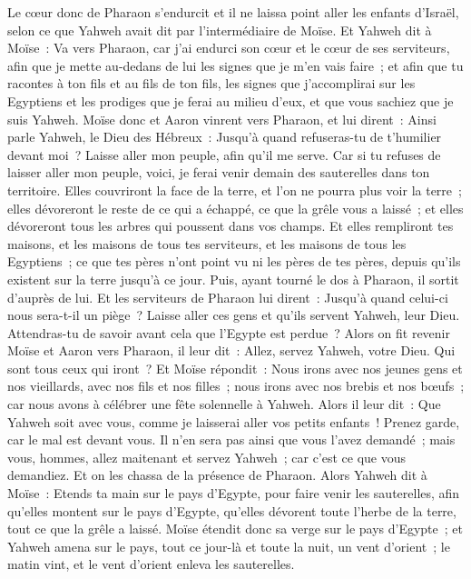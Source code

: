 \begin{multicols}{2}
Le cœur donc de Pharaon s'endurcit et il ne laissa point aller les enfants d'Israël, selon ce que Yahweh avait dit par l'intermédiaire de Moïse.
\VerseOne{} Et Yahweh dit à Moïse~: Va vers Pharaon, car j'ai endurci son cœur et le cœur de ses serviteurs, afin que je mette au-dedans de lui les signes que je m'en vais faire~;
et afin que tu racontes à ton fils et au fils de ton fils, les signes que j'accomplirai sur les Egyptiens et les prodiges que je ferai au milieu d'eux, et que vous sachiez que je suis Yahweh.
Moïse donc et Aaron vinrent vers Pharaon, et lui dirent~: Ainsi parle Yahweh, le Dieu des Hébreux~: Jusqu'à quand refuseras-tu de t'humilier devant moi~? Laisse aller mon peuple, afin qu'il me serve.
Car si tu refuses de laisser aller mon peuple, voici, je ferai venir demain des sauterelles dans ton territoire.
Elles couvriront la face de la terre, et l'on ne pourra plus voir la terre~; elles dévoreront le reste de ce qui a échappé, ce que la grêle vous a laissé~; et elles dévoreront tous les arbres qui poussent dans vos champs.
Et elles rempliront tes maisons, et les maisons de tous tes serviteurs, et les maisons de tous les Egyptiens~; ce que tes pères n'ont point vu ni les pères de tes pères, depuis qu'ils existent sur la terre jusqu'à ce jour. Puis, ayant tourné le dos à Pharaon, il sortit d'auprès de lui.
Et les serviteurs de Pharaon lui dirent~: Jusqu'à quand celui-ci nous sera-t-il un piège~? Laisse aller ces gens et qu'ils servent Yahweh, leur Dieu. Attendras-tu de savoir avant cela que l'Egypte est perdue~?
Alors on fit revenir Moïse et Aaron vers Pharaon, il leur dit~: Allez, servez Yahweh, votre Dieu. Qui sont tous ceux qui iront~?
 Et Moïse répondit~: Nous irons avec nos jeunes gens et nos vieillards, avec nos fils et nos filles~; nous irons avec nos brebis et nos bœufs~; car nous avons à célébrer une fête solennelle à Yahweh.
Alors il leur dit~: Que Yahweh soit avec vous, comme je laisserai aller vos petits enfants~! Prenez garde, car le mal est devant vous.
Il n'en sera pas ainsi que vous l'avez demandé~; mais vous, hommes, allez maitenant et servez Yahweh~; car c'est ce que vous demandiez. Et on les chassa de la présence de Pharaon.
Alors Yahweh dit à Moïse~: Etends ta main sur le pays d'Egypte, pour faire venir les sauterelles, afin qu'elles montent sur le pays d'Egypte, qu'elles dévorent toute l'herbe de la terre, tout ce que la grêle a laissé.
Moïse étendit donc sa verge sur le pays d'Egypte~; et Yahweh amena sur le pays, tout ce jour-là et toute la nuit, un vent d'orient~; le matin vint, et le vent d'orient enleva les sauterelles.

\end{multicols}
